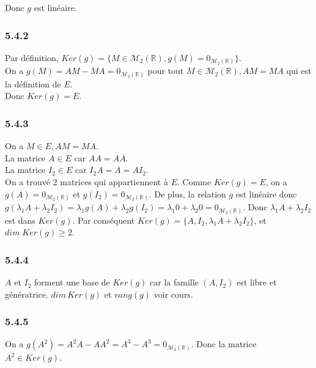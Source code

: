 \documentclass[]{book}
\theoremstyle{definition}
\newcommand{\bb}[1]{\mathbb{#1}}
\newcommand{\R}{\bb{R}}
\begin{document}
Donc $g$ est lin\'eaire.

\subsubsection*{5.4.2}	
Par d\'efinition, $Ker(g) = \{ M \in \mathcal{M}_2(\R), g(M) = 0_{\mathcal{M}_2(\R)}\}$.\\
On a $g(M) = AM - MA = 0_{\mathcal{M}_2(\R)}$ pour tout $M \in \mathcal{M}_2(\R), AM=MA$ qui est la d\'efinition de $E$.\\

Donc $Ker(g) = E$. 

\subsubsection*{5.4.3}	
On a $M \in E, AM = MA$.\\
La matrice $A \in E$ car $AA =AA$.\\
La matrice $I_2 \in E$ car $I_2A = A = AI_2$.\\

On a trouv\'e 2 matrices qui appartiennent \`a $E$. Comme $Ker(g) = E$, on a $g(A) = 0_{\mathcal{M}_2(\R)}$ et $g(I_2) = 0_{\mathcal{M}_2(\R)}$. De plus, la relation $g$ est lin\'eaire donc $g(\lambda_1 A + \lambda_2 I_2) = \lambda_1g(A) + \lambda_2 g(I_2) = \lambda_1 0 + \lambda_2 0 = 0_{\mathcal{M}_2(\R)}$. Donc $\lambda_1 A + \lambda_2 I_2$ est dans $Ker(g)$. Par cons\'equent $Ker(g) = \{A,I_2,\lambda_1 A + \lambda_2 I_2\}$, et $dim\; Ker(g) \geq 2$.

\subsubsection*{5.4.4}	
$A$ et $I_2$ forment une base de $Ker(g)$ car la famille $(A,I_2)$ est libre et g\'en\'eratrice. 
$dim\, Ker(g)$ et $rang(g)$ voir cours.


\subsubsection*{5.4.5}	
On a $g(A^2) = A^2A - AA^2 = A^3 - A^3 = 0_{\mathcal{M}_2(\R)}$. Donc la matrice $A^2 \in Ker(g)$.\\
\end{document}
